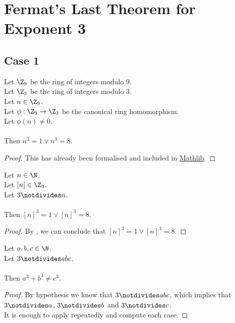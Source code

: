 
\chapter{Fermat's Last Theorem for Exponent 3}

\section{Case 1}

\begin{lemma}
  \label{lmm:cube_of_castHom_ne_zero}
  \leanok
  Let $\Z_9$ be the ring of integers modulo $9$. \\
  Let $\Z_3$ be the ring of integers modulo $3$. \\
  Let $n \in \Z_9$. \\
  Let $\phi : \Z_9 \to \Z_3$ be the canonical ring homomorphism. \\
  Let $\phi(n) \neq 0$. \\ \\
  Then $n^3=1 \lor n^3=8$.
\end{lemma}
\begin{proof}
  \leanok
  This has already been formalised and included in \href{https://pitmonticone.github.io/FLT3/docs/FLT3/Mathlib/NumberTheory/FLT/Three.html#cube_of_castHom_ne_zero}{Mathlib}.
\end{proof}

\begin{lemma}
  \label{lmm:cube_of_not_dvd}
  \leanok
  Let $n \in \N$. \\
  Let $\left[n \right] \in \Z_9$. \\
  Let $3 \notdivides n$. \\ \\
  Then $\left[n \right]^3 = 1 \lor \left[n \right]^3 = 8$.
\end{lemma}
\begin{proof}
  \leanok
  By , we can conclude that $\left[n \right]^3 = 1 \lor \left[n \right]^3 = 8$.
\end{proof}

\begin{theorem}
    \label{thm:fermatLastTheoremThree_case_1}
    \leanok
    Let $a, b, c \in \N$. \\
    Let $3 \notdivides abc$. \\\\
    Then $a ^ 3 + b ^ 3 \neq c ^ 3$.
\end{theorem}
\begin{proof}
  \leanok
  By hypothesis we know that $3 \notdivides abc$, which implies that $3 \notdivides a$, $3 \notdivides b$ and $3 \notdivides c$. \\
  It is enough to apply  repeatedly and compute each case.
\end{proof}

